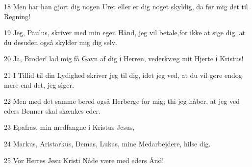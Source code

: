 \par 18 Men har han gjort dig nogen Uret eller er dig noget skyldig, da før mig det til Regning!
\par 19 Jeg, Paulus, skriver med min egen Hånd, jeg vil betale,for ikke at sige dig, at du desuden også skylder mig dig selv.
\par 20 Ja, Broder! lad mig få Gavn af dig i Herren, vederkvæg mit Hjerte i Kristus!
\par 21 I Tillid til din Lydighed skriver jeg til dig, idet jeg ved, at du vil gøre endog mere end det, jeg siger.
\par 22 Men med det samme bered også Herberge for mig; thi jeg håber, at jeg ved eders Bønner skal skænkes eder.
\par 23 Epafras, min medfangne i Kristus Jesus,
\par 24 Markus, Aristarkus, Demas, Lukas, mine Medarbejdere, hilse dig.
\par 25 Vor Herres Jesu Kristi Nåde være med eders Ånd!



